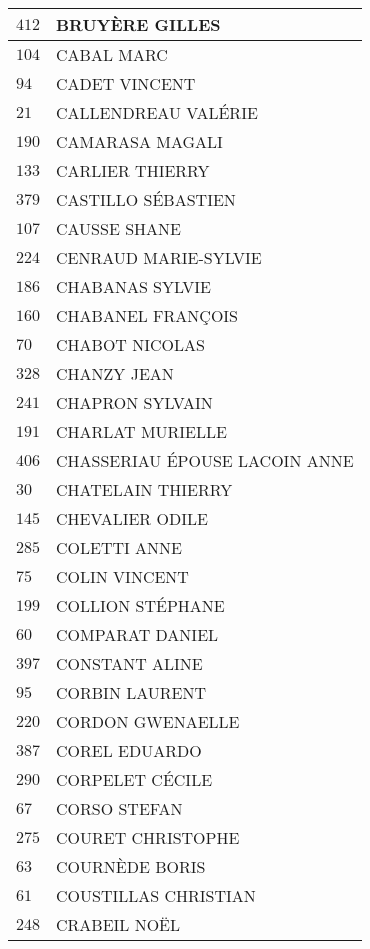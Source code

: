 \begin{xltabular}{\linewidth}{|l|X|}
    \hline
    $412$ & BRUYÈRE GILLES \\
    \hline
    $104$ & CABAL MARC \\
    \hline
    $94$ & CADET VINCENT \\
    \hline
    $21$ & CALLENDREAU VALÉRIE \\
    \hline
    $190$ & CAMARASA MAGALI \\
    \hline
    $133$ & CARLIER THIERRY \\
    \hline
    $379$ & CASTILLO SÉBASTIEN \\
    \hline
    $107$ & CAUSSE SHANE \\
    \hline
    $224$ & CENRAUD MARIE-SYLVIE \\
    \hline
    $186$ & CHABANAS SYLVIE \\
    \hline
    $160$ & CHABANEL FRANÇOIS \\
    \hline
    $70$ & CHABOT NICOLAS \\
    \hline
    $328$ & CHANZY JEAN \\
    \hline
    $241$ & CHAPRON SYLVAIN \\
    \hline
    $191$ & CHARLAT MURIELLE \\
    \hline
    $406$ & CHASSERIAU ÉPOUSE LACOIN ANNE \\
    \hline
    $30$ & CHATELAIN THIERRY \\
    \hline
    $145$ & CHEVALIER ODILE \\
    \hline
    $285$ & COLETTI ANNE \\
    \hline
    $75$ & COLIN VINCENT \\
    \hline
    $199$ & COLLION STÉPHANE \\
    \hline
    $60$ & COMPARAT DANIEL \\
    \hline
    $397$ & CONSTANT ALINE \\
    \hline
    $95$ & CORBIN LAURENT \\
    \hline
    $220$ & CORDON GWENAELLE \\
    \hline
    $387$ & COREL EDUARDO \\
    \hline
    $290$ & CORPELET CÉCILE \\
    \hline
    $67$ & CORSO STEFAN \\
    \hline
    $275$ & COURET CHRISTOPHE \\
    \hline
    $63$ & COURNÈDE BORIS \\
    \hline
    $61$ & COUSTILLAS CHRISTIAN \\
    \hline
    $248$ & CRABEIL NOËL \\

\end{xltabular}
